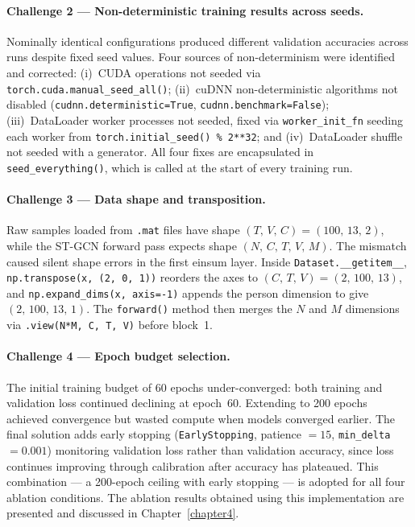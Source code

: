 \paragraph{Challenge 2 --- Non-deterministic training results across seeds.}
Nominally identical configurations produced different validation accuracies across runs despite fixed seed values. Four sources of non-determinism were identified and corrected: (i)~CUDA operations not seeded via \texttt{torch.cuda.manual\_seed\_all()}; (ii)~cuDNN non-deterministic algorithms not disabled (\texttt{cudnn.deterministic=True}, \texttt{cudnn.benchmark=False}); (iii)~DataLoader worker processes not seeded, fixed via \texttt{worker\_init\_fn} seeding each worker from \texttt{torch.initial\_seed() \% 2**32}; and (iv)~DataLoader shuffle not seeded with a generator. All four fixes are encapsulated in \texttt{seed\_everything()}, which is called at the start of every training run.

\paragraph{Challenge 3 --- Data shape and transposition.}
Raw samples loaded from \texttt{.mat} files have shape $(T,\,V,\,C) = (100,\,13,\,2)$, while the ST-GCN forward pass expects shape $(N,\,C,\,T,\,V,\,M)$. The mismatch caused silent shape errors in the first einsum layer. Inside \texttt{Dataset.\_\_getitem\_\_}, \texttt{np.transpose(x, (2, 0, 1))} reorders the axes to $(C,\,T,\,V) = (2,\,100,\,13)$, and \texttt{np.expand\_dims(x, axis=-1)} appends the person dimension to give $(2,\,100,\,13,\,1)$. The \texttt{forward()} method then merges the $N$ and $M$ dimensions via \texttt{.view(N*M, C, T, V)} before block~1.

\paragraph{Challenge 4 --- Epoch budget selection.}
The initial training budget of 60 epochs under-converged: both training and validation loss continued declining at epoch~60. Extending to 200 epochs achieved convergence but wasted compute when models converged earlier. The final solution adds early stopping (\texttt{EarlyStopping}, patience $= 15$, \texttt{min\_delta} $= 0.001$) monitoring validation loss rather than validation accuracy, since loss continues improving through calibration after accuracy has plateaued. This combination --- a 200-epoch ceiling with early stopping --- is adopted for all four ablation conditions. The ablation results obtained using this implementation are presented and discussed in Chapter~\ref{chapter4}.
